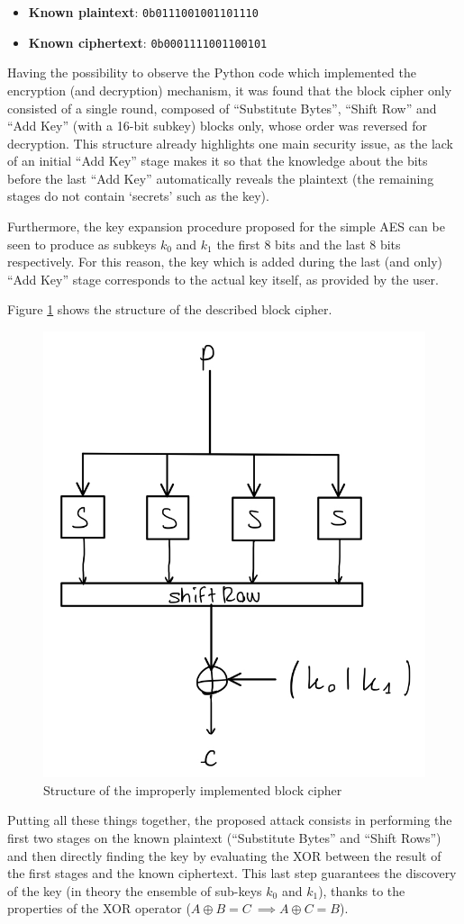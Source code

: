 \documentclass[12pt]{article}
\begin{document}
\begin{itemize}
   \item \textbf{Known plaintext}: \verb|0b0111001001101110|
   \item \textbf{Known ciphertext}: \verb|0b0001111001100101| 
\end{itemize}

Having the possibility to observe the Python code which implemented the encryption (and decryption) mechanism, it was found that the block cipher only consisted of a single round, composed of ``Substitute Bytes'', ``Shift Row'' and ``Add Key'' (with a 16-bit subkey) blocks only, whose order was reversed for decryption.
This structure already highlights one main security issue, as the lack of an initial ``Add Key'' stage makes it so that the knowledge about the bits before the last ``Add Key'' automatically reveals the plaintext (the remaining stages do not contain `secrets' such as the key).

Furthermore, the key expansion procedure proposed for the simple AES can be seen to produce as subkeys $k_0$ and $k_1$ the first 8 bits and the last 8 bits respectively. For this reason, the key which is added during the last (and only) ``Add Key'' stage corresponds to the actual key itself, as provided by the user.

Figure \ref{fig:3.1} shows the structure of the described block cipher.

\begin{figure} [ht]
   \centering
   \includegraphics[width = .5\linewidth]{improper_block_scheme.jpeg}
   \caption{Structure of the improperly implemented block cipher}
   \label{fig:3.1}
\end{figure}

Putting all these things together, the proposed attack consists in performing the first two stages on the known plaintext (``Substitute Bytes'' and ``Shift Rows'') and then directly finding the key by evaluating the XOR between the result of the first stages and the known ciphertext. This last step guarantees the discovery of the key (in theory the ensemble of sub-keys $k_0$ and $k_1$), thanks to the properties of the XOR operator ($A\oplus B = C\ \implies A\oplus C = B$).
\end{document}
